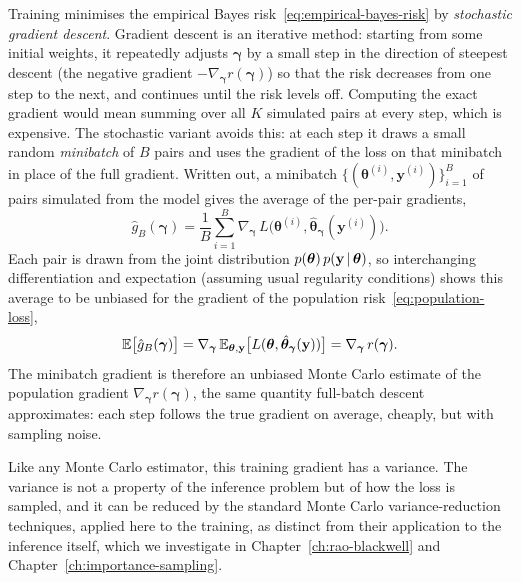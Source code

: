 Training minimises the empirical Bayes
risk~\eqref{eq:empirical-bayes-risk} by \emph{stochastic gradient
descent}. Gradient descent is an iterative method: starting from some
initial weights, it repeatedly adjusts $\bm{\gamma}$ by a small step in
the direction of steepest descent (the negative gradient
$-\nabla_{\bm{\gamma}} r(\bm{\gamma})$) so that the risk decreases
from one step to the next, and continues until the risk levels off.
Computing the exact gradient would mean summing over all $K$ simulated
pairs at every step, which is expensive. The stochastic variant
avoids this: at each step it draws a small random \emph{minibatch} of
$B$ pairs and uses the gradient of the loss on that minibatch in place
of the full gradient. Written out, a minibatch
$\{(\bm{\theta}^{(i)}, \mathbf{y}^{(i)})\}_{i=1}^{B}$ of pairs simulated
from the model gives the average of the per-pair gradients,
%
\begin{equation}
  \hat{g}_{B}(\bm{\gamma})
  = \frac{1}{B}\sum_{i=1}^{B}
    \nabla_{\bm{\gamma}}\,
    L\big(\bm{\theta}^{(i)},
    \hat{\bm{\theta}}_{\bm{\gamma}}(\mathbf{y}^{(i)})\big).
  \label{eq:minibatch-gradient}
\end{equation}
%
Each pair is drawn from the joint distribution
$p(\bm{\theta})\,p(\mathbf{y} \,|\, \bm{\theta})$, so interchanging
differentiation and expectation (assuming usual regularity conditions) shows this average to be unbiased for
the gradient of the population risk~\eqref{eq:population-loss},
%
\begin{equation}
  \mathbb{E}\big[\hat{g}_{B}(\bm{\gamma})\big]
  = \nabla_{\bm{\gamma}}\,
    \mathbb{E}_{\bm{\theta}, \mathbf{y}}
    \big[L(\bm{\theta}, \hat{\bm{\theta}}_{\bm{\gamma}}(\mathbf{y}))\big]
  = \nabla_{\bm{\gamma}}\, r(\bm{\gamma}).
  \label{eq:minibatch-unbiased}
\end{equation}
%
The minibatch gradient is therefore an unbiased Monte Carlo estimate of
the population gradient $\nabla_{\bm{\gamma}} r(\bm{\gamma})$, the same
quantity full-batch descent approximates: each step follows the true
gradient on average, cheaply, but with sampling noise.

Like any Monte Carlo estimator, this training gradient has a variance.
The variance is not a property of the inference problem but of how the
loss is sampled, and it can be reduced by the standard Monte Carlo
variance-reduction techniques, applied here to the training, as
distinct from their application to the inference itself, which we
investigate in Chapter~\ref{ch:rao-blackwell} and
Chapter~\ref{ch:importance-sampling}.

